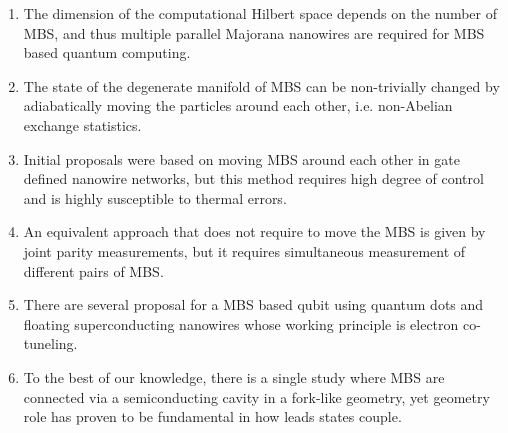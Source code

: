 \begin{enumerate}
\item The dimension of the computational Hilbert space depends on the number of MBS, and thus multiple parallel Majorana nanowires are required for MBS based quantum computing.
\item The state of the degenerate manifold of MBS can be non-trivially changed by adiabatically moving the particles around each other, i.e. non-Abelian exchange statistics.
\item Initial proposals were based on moving MBS around each other in gate defined nanowire networks, but this method requires high degree of control and is highly susceptible to thermal errors.
\item An equivalent approach that does not require to move the MBS is given by joint parity measurements, but it requires simultaneous measurement of different pairs of MBS.
\item There are several proposal for a MBS based qubit using quantum dots and floating superconducting nanowires whose working principle is electron co-tuneling.
\item To the best of our knowledge, there is a single study where MBS are connected via a semiconducting cavity in a fork-like geometry, yet geometry role has proven to be fundamental in how leads states couple.
\end{enumerate}



